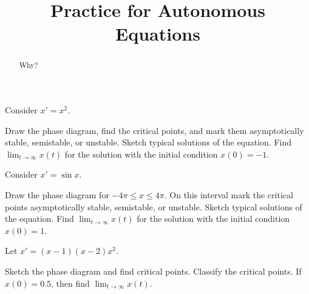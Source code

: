 \documentclass{ximera}
\title{Practice for Autonomous Equations}
\begin{document}
\begin{abstract}
    Why?
\end{abstract}
\maketitle


\begin{exercise}
    Consider $x' = x^2$.
    \begin{tasks}
        \task Draw the phase diagram, find the critical points, and mark them asymptotically stable, semistable, or unstable.
        \task Sketch typical solutions of the equation.
        \task Find $\displaystyle \lim_{t\to \infty} x(t)$ for the solution with the initial condition
        $x(0) = -1$.
    \end{tasks}
\end{exercise}



\begin{exercise}
    Consider $x' = \sin x$.
    \begin{tasks}
        \task Draw the phase diagram for $-4\pi \leq x \leq 4\pi$.  On this interval
        mark the critical points asymptotically stable, semistable, or unstable.
        \task Sketch typical solutions of the equation.
        \task Find $\displaystyle \lim_{t\to \infty} x(t)$ for the solution with the initial condition
        $x(0) = 1$.
    \end{tasks}
\end{exercise}


\begin{exercise}
    Let $x'=(x-1)(x-2)x^2$.
    \begin{tasks}
        \task Sketch the phase diagram and find critical
        points.
        \task Classify the critical points.
        \task If $x(0)=0.5$, then find $\displaystyle \lim_{t\to\infty} x(t)$.
    \end{tasks}
\end{exercise}


\end{document}
